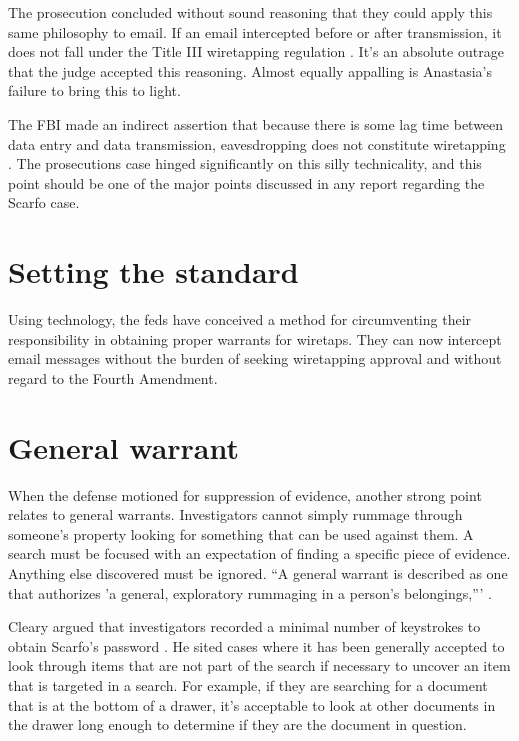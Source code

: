 ﻿\documentclass[12pt,titlepage]{article}             %
\begin{document}
  The prosecution concluded without sound reasoning that they could
  apply this same philosophy to email.  If an email intercepted before
  or after transmission, it does not fall under the Title III
  wiretapping regulation \cite{CLEARY}.  It's an absolute outrage that
  the judge accepted this reasoning.  Almost equally appalling is
  Anastasia's failure to bring this to light.
  
  The FBI made an indirect assertion that because there is some lag
  time between data entry and data transmission, eavesdropping does not
  constitute wiretapping \cite{CLEARY}.  The prosecutions case hinged
  significantly on this silly technicality, and this point should be
  one of the major points discussed in any report regarding the Scarfo
  case.

  \section{Setting the standard}

  Using technology, the feds have conceived a method for circumventing
  their responsibility in obtaining proper warrants for wiretaps.
  They can now intercept email messages without the burden of seeking
  wiretapping approval and without regard to the Fourth Amendment.  

  \section{General warrant}

  When the defense motioned for suppression of evidence, another
  strong point relates to general warrants.  Investigators cannot
  simply rummage through someone's property looking for something that
  can be used against them.  A search must be focused with an
  expectation of finding a specific piece of evidence.  Anything else
  discovered must be ignored.  ``A general warrant is described as one
  that authorizes 'a general, exploratory rummaging in a person's
  belongings,''' \cite{GELMAN}.
  
  Cleary argued that investigators recorded a minimal number of
  keystrokes to obtain Scarfo's password \cite[p.20]{CLEARY}.  He
  sited cases where it has been generally accepted to look through
  items that are not part of the search if necessary to uncover an
  item that is targeted in a search.  For example, if they are
  searching for a document that is at the bottom of a drawer, it's
  acceptable to look at other documents in the drawer long enough to
  determine if they are the document in question.
\end{document}
